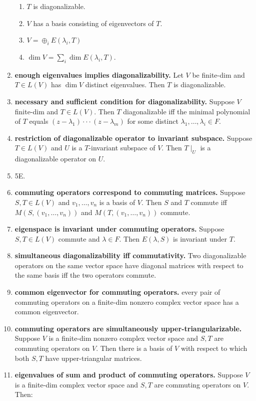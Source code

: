 \begin{enumerate}
	\begin{enumerate}
		\item $T$ is diagonalizable. 
		\item $V$ has a basis consisting of eigenvectors of $T$. 
		\item $V = \oplus_i E(\lambda_i, T)$
		\item $\dim V = \sum_i \dim E(\lambda_i,T)$. 
	\end{enumerate}
	\item \textbf{enough eigenvalues implies diagonalizability. } Let $V$ be finite-dim and $T \in L(V)$ has $\dim V$ distinct eigenvalues. Then $T$ is diagonalizable. 
	\item \textbf{necessary and sufficient condition for diagonalizability. } Suppose $V$ finite-dim and $T \in L(V)$. Then $T$ diagonalizable iff the minimal polynomial of $T$ equals $(z-\lambda_1) \cdot \cdot \cdot (z-\lambda_m)$ for some distinct $\lambda_1,\dots,\lambda_i \in F$. 
	\item \textbf{restriction of diagonalizable operator to invariant subspace. } Suppose $T \in L(V)$ and $U$ is a $T$-invariant subspace of $V$. Then $T \mid_U$ is a diagonalizable operator on $U$. 
	\item 5E. 
	\item \textbf{commuting operators correspond to commuting matrices. } Suppose $S,T \in L(V)$ and $v_1,\dots,v_n$ is a basis of $V$. Then $S$ and $T$ commute iff $M(S,(v_1,\dots,v_n))$ and $M(T,(v_1,\dots,v_n))$ commute. 
	\item \textbf{eigenspace is invariant under commuting operators. } Suppose $S,T \in L(V)$ commute and $\lambda \in F$. Then $E(\lambda,S)$ is invariant under $T$. 
	\item \textbf{simultaneous diagonalizability iff commutativity. } Two diagonalizable operators on the same vector space have diagonal matrices with respect to the same basis iff the two operators commute. 
	\item \textbf{common eigenvector for commuting operators. } every pair of commuting operators on a finite-dim nonzero complex vector space has a common eigenvector. 
	\item \textbf{commuting operators are simultaneously upper-triangularizable. } Suppose $V$ is a finite-dim nonzero complex vector space and $S,T$ are commuting operators on $V$. Then there is a basis of $V$ with respect to which both $S,T$ have upper-triangular matrices. 
	\item \textbf{eigenvalues of sum and product of commuting operators. } Suppose $V$ is a finite-dim complex vector space and $S,T$ are commuting operators on $V$. Then: 

\end{enumerate}
